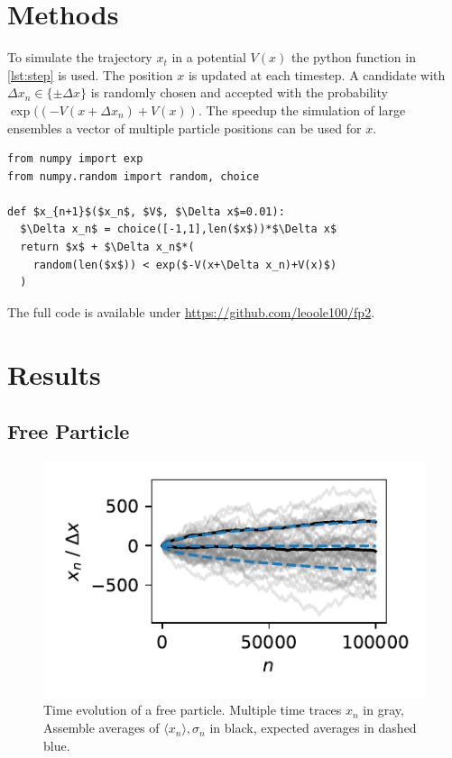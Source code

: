 \documentclass[
    parskip=half, 
    twoside=false,
    twocolumn=true,
    fontsize=11pt,
]{scrarticle}
\begin{document}
\section{Methods}
To simulate the trajectory $x_t$ in a potential $V(x)$ the python function in \autoref{lst:step} is used.
The position $x$ is updated at each timestep.
A candidate with $\Delta x_n \in \{\pm \Delta x\}$ is randomly chosen and accepted with the probability $\exp((-V(x+\Delta x_n)+V(x))$.
The speedup the simulation of large ensembles a vector of multiple particle positions can be used for $x$.

\begin{lstlisting}[caption={Python function used for time evolution.},label={lst:step},captionpos=b]
from numpy import exp
from numpy.random import random, choice

def $x_{n+1}$($x_n$, $V$, $\Delta x$=0.01):
  $\Delta x_n$ = choice([-1,1],len($x$))*$\Delta x$
  return $x$ + $\Delta x_n$*(
    random(len($x$)) < exp($-V(x+\Delta x_n)+V(x)$)
  )
\end{lstlisting}

The full code is available under \url{https://github.com/leoole100/fp2}.

\section{Results}
\subsection{Free Particle}
\begin{figure}
    \centering
    \includegraphics{figures/01 time trace.pdf}
    \caption{
        Time evolution of a free particle.
        Multiple time traces $x_n$ in gray, Assemble averages of $\langle x_n\rangle, \sigma_n$ in black, expected averages in dashed blue.
    }
    \label{fig:pt1_trajectory}
\end{figure}
\end{document}

